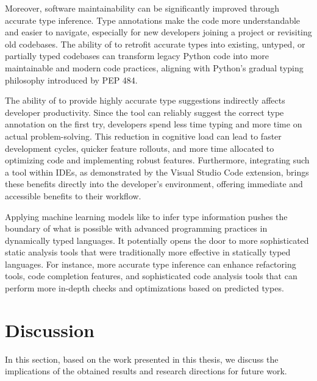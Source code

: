 Moreover, software maintainability can be significantly improved through accurate type inference. Type annotations make the code more understandable and easier to navigate, especially for new developers joining a project or revisiting old codebases. The ability of  to retrofit accurate types into existing, untyped, or partially typed codebases can transform legacy Python code into more maintainable and modern code practices, aligning with Python's gradual typing philosophy introduced by PEP 484.

The ability of  to provide highly accurate type suggestions indirectly affects developer productivity. Since the tool can reliably suggest the correct type annotation on the first try, developers spend less time typing and more time on actual problem-solving. This reduction in cognitive load can lead to faster development cycles, quicker feature rollouts, and more time allocated to optimizing code and implementing robust features. Furthermore, integrating such a tool within IDEs, as demonstrated by the Visual Studio Code extension, brings these benefits directly into the developer's environment, offering immediate and accessible benefits to their workflow.

Applying machine learning models like  to infer type information pushes the boundary of what is possible with advanced programming practices in dynamically typed languages. It potentially opens the door to more sophisticated static analysis tools that were traditionally more effective in statically typed languages. For instance, more accurate type inference can enhance refactoring tools, code completion features, and sophisticated code analysis tools that can perform more in-depth checks and optimizations based on predicted types.

\section{Discussion}
In this section, based on the work presented in this thesis, we discuss 
the implications of the obtained results and research directions for future work.

